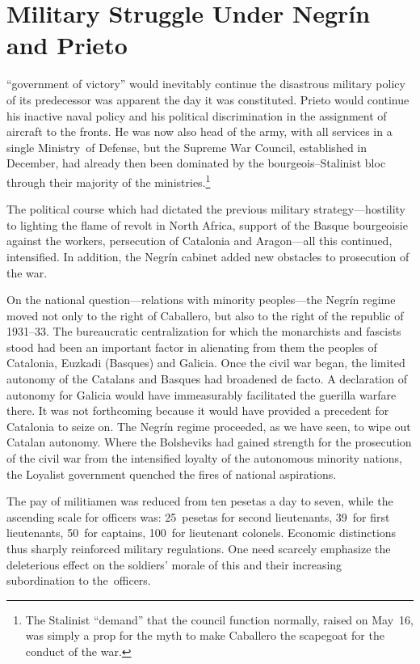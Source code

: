 \chapter{Military Struggle Under Negr\'in and Prieto}

\indexIPrieto{}\indexJNegrin
{} ``government of victory'' would inevitably continue the disastrous military policy of its predecessor was apparent the day it was constituted. Prieto would continue his inactive naval policy and his political discrimination in the assignment of aircraft to the fronts. He was now also head of the army, with all services in a single Ministry~of Defense, but the Supreme War Council, established in December, had already then been dominated by the bourgeois--Stalinist bloc through their majority of the ministries.\footnote{The Stalinist ``demand'' that the council function normally, raised on May~16, was simply a prop for the myth to make Caballero the scapegoat for the conduct of the war.}

The political course which had dictated the previous military stra\-te\-gy---hostility to lighting the flame of revolt in North Africa, support of the Basque bourgeoisie against the workers, persecution of Catalonia and Aragon---all this continued, intensified. In addition, the Negr\'in cabinet added new obstacles to prosecution of the war.

On the national question---relations with minority peoples---the Negr\'in regime moved not only to the right of Caballero, but also to the right of the republic of 1931--33. The bureaucratic centralization for which the monarchists and fascists stood had been an important factor in alienating from them the peoples of Catalonia, Euzkadi (Basques) and Galicia. Once the civil war began, the limited autonomy of the Catalans and Basques had broadened de facto. A declaration of autonomy for Galicia would have immeasurably facilitated the guerilla warfare there. It was not forthcoming because it would have provided a precedent for Catalonia to seize on. The Negr\'in regime proceeded, as we have seen, to wipe out Catalan autonomy. Where the Bolsheviks had gained strength for the prosecution of the civil war from the intensified loyalty of the autonomous minority nations, the Loyalist government quenched the fires of national aspirations.

The pay of militiamen was reduced from ten pesetas a day to seven, while the ascending scale for officers was: 25~pesetas for second lieutenants, 39~for first lieutenants, 50~for captains, 100~for lieutenant colonels. Economic distinctions thus sharply reinforced military regulations. One need scarcely emphasize the deleterious effect on the soldiers’ morale of this and their increasing subordination to the~officers.

